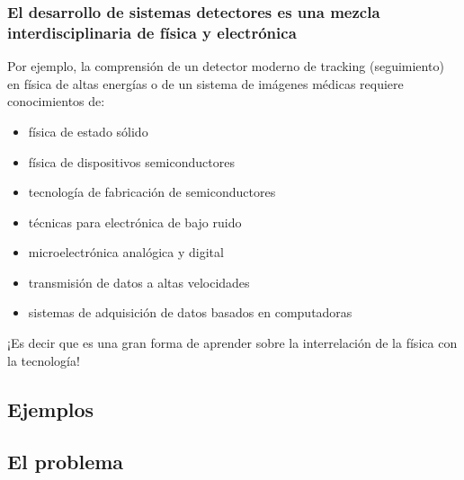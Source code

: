\documentclass{beamer}
\begin{document}
\begin{frame}
\frametitle{\small{El desarrollo de sistemas detectores es una mezcla interdisciplinaria de física y electrónica}}
{
\small{Por ejemplo, la comprensión de un detector moderno de tracking
(seguimiento) en física de altas energías o de un sistema de imágenes médicas
requiere conocimientos de:}
\begin{itemize}
\item física de estado sólido
\item física de dispositivos semiconductores
\item tecnología de fabricación de semiconductores
\item técnicas para electrónica de bajo ruido
\item microelectrónica analógica y digital
\item transmisión de datos a altas velocidades
\item sistemas de adquisición de datos basados en computadoras
\end{itemize}
}
\begin{exampleblock}{}
\small{¡Es decir que es una gran forma de aprender sobre la interrelación de la
\alert{física} con la \alert{tecnología}!}
\end{exampleblock}
\end{frame}

\subsection{Ejemplos}

\subsection{El problema}
\end{document}
